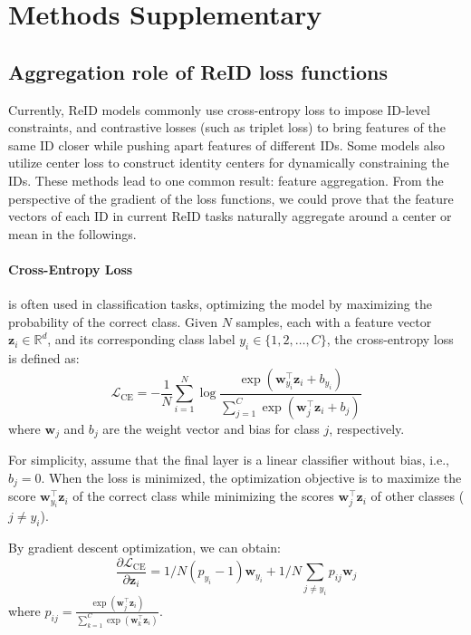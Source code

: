 \clearpage
\setcounter{page}{1}
\maketitlesupplementary



\section{Methods Supplementary}
\subsection{Aggregation role of ReID loss functions}
Currently, ReID models commonly use cross-entropy loss to impose ID-level constraints, and contrastive losses (such as triplet loss) to bring features of the same ID closer while pushing apart features of different IDs. Some models also utilize center loss to construct identity centers for dynamically constraining the IDs. These methods lead to one common result: feature aggregation. From the perspective of the gradient of the loss functions, we could prove that the feature vectors of each ID in current ReID tasks naturally aggregate around a center or mean in the followings.
\paragraph{Cross-Entropy Loss} 
is often used in classification tasks, optimizing the model by maximizing the probability of the correct class. Given $N$ samples, each with a feature vector $\mathbf{z}_i \in \mathbb{R}^d$, and its corresponding class label $y_i \in \{1, 2, \dots, C\}$, the cross-entropy loss is defined as:
\begin{equation}
\mathcal{L}_{\text{CE}} = -\frac{1}{N} \sum_{i=1}^{N} \log \frac{\exp(\mathbf{w}_{y_i}^\top \mathbf{z}_i + b_{y_i})}{\sum_{j=1}^{C} \exp(\mathbf{w}_j^\top \mathbf{z}_i + b_j)}
\end{equation}
where $\mathbf{w}_j$ and $b_j$ are the weight vector and bias for class $j$, respectively.

For simplicity, assume that the final layer is a linear classifier without bias, i.e., $b_j = 0$. When the loss is minimized, the optimization objective is to maximize the score $\mathbf{w}_{y_i}^\top \mathbf{z}_i$ of the correct class while minimizing the scores $\mathbf{w}_j^\top \mathbf{z}_i$ of other classes ($j \neq y_i$).

By gradient descent optimization, we can obtain:
\begin{equation}
\frac{\partial \mathcal{L}_{\text{CE}}}{\partial \mathbf{z}_i} = 1/N\left(p_{y_i} - 1\right) \mathbf{w}_{y_i} + 1/N\sum_{j \neq y_i} p_{ij} \mathbf{w}_j
\end{equation}
where $p_{ij} = \frac{\exp(\mathbf{w}_j^\top \mathbf{z}_i)}{\sum_{k=1}^{C} \exp(\mathbf{w}_k^\top \mathbf{z}_i)}$.

